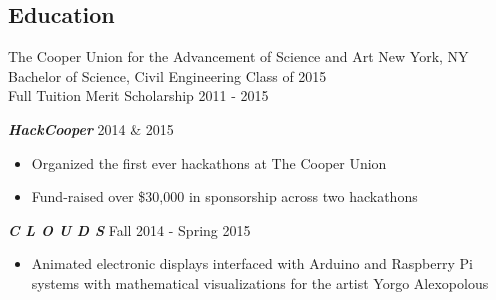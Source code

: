 \documentclass[overlapped]{res}
\begin{document}
\begin{resume}
    \section{Education}
    The Cooper Union for the Advancement of Science and Art \hfill New York, NY  \\
    Bachelor of Science, Civil Engineering              \hfill Class of 2015 \\
    Full Tuition Merit Scholarship                          \hfill 2011 - 2015


    {\bf {\em HackCooper\/}} \hfill 2014 \& 2015
    \begin{itemize} \itemsep-2pt
        \item
            Organized the first ever hackathons at The Cooper Union
        \item
            Fund-raised over \$30,000 in sponsorship across two hackathons
    \end{itemize}

    {\bf {\em C L O U D S\/}} \hfill Fall 2014 - Spring 2015
    \begin{itemize} \itemsep-2pt
        \item Animated electronic displays interfaced with Arduino and Raspberry Pi systems with mathematical visualizations for the artist Yorgo Alexopolous
    \end{itemize}



\end{resume}
\end{document}
